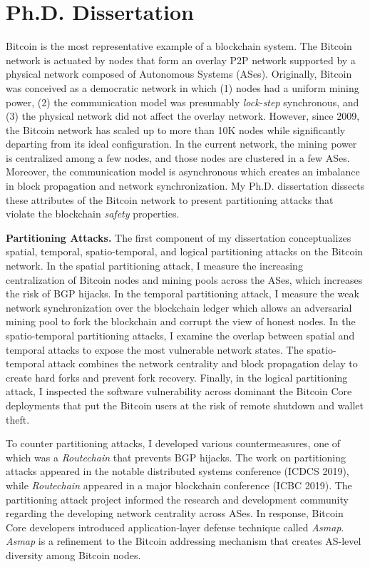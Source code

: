 \documentclass{NSF}
\newcommand{\BfPara}[1]{{\noindent\textbf{#1.}}\xspace}
\begin{document}
\section{Ph.D. Dissertation}
Bitcoin is the most representative example of a blockchain system. The Bitcoin network is actuated by nodes that form an overlay P2P network supported by a physical network composed of Autonomous Systems (ASes). Originally, Bitcoin was conceived as a democratic network in which (1) nodes had a uniform mining power, (2) the communication model was presumably {\em lock-step} synchronous, and (3) the physical network did not affect the overlay network. However, since 2009, the Bitcoin network has scaled up to more than 10K nodes while significantly departing from its ideal configuration. In the current network, the mining power is centralized among a few nodes, and those nodes are clustered in a few ASes. Moreover, the communication model is asynchronous which creates an imbalance in block propagation and network synchronization. My Ph.D. dissertation dissects these attributes of the Bitcoin network to present partitioning attacks that violate the blockchain {\em safety} properties. 



\vspace{2mm}

\BfPara{Partitioning Attacks} The first component of my dissertation conceptualizes spatial, temporal, spatio-temporal, and logical partitioning attacks on the Bitcoin network. In the spatial partitioning attack, I measure the increasing centralization of Bitcoin nodes and mining pools across the ASes, which increases the risk of BGP hijacks. In the temporal partitioning attack, I measure the weak network synchronization over the blockchain ledger which allows an adversarial mining pool to fork the blockchain and corrupt the view of honest nodes. In the spatio-temporal partitioning attacks, I examine the overlap between spatial and temporal attacks to expose the most vulnerable network states. The spatio-temporal attack combines the network centrality and block propagation delay to create hard forks and prevent fork recovery. Finally, in the logical partitioning attack, I inspected the software vulnerability across dominant the Bitcoin Core deployments that put the Bitcoin users at the risk of remote shutdown and wallet theft. 

To counter partitioning attacks, I developed various countermeasures, one of which was a {\em Routechain} that prevents BGP hijacks. The work on partitioning attacks appeared in the notable distributed systems conference (ICDCS 2019), while {\em Routechain} appeared in a major blockchain conference (ICBC 2019). The partitioning attack project informed the research and development community regarding the developing network centrality across ASes. In response, Bitcoin Core developers introduced application-layer defense technique called {\em Asmap}. {\em Asmap} is a refinement to the Bitcoin addressing mechanism that creates AS-level diversity among Bitcoin nodes. 
\end{document}
